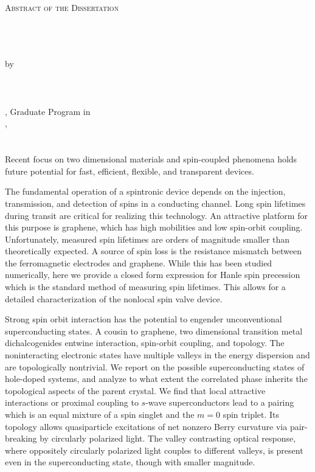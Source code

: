 \clearpage
\centering
\vspace*{-\toptafiddle}

\textsc{Abstract of the Dissertation} \\~\\

\SingleSpacing{}

\thetitle{} \\~\\
by \\~\\
\theauthor{} \\~\\

\thedegree, Graduate Program in \thefield{} \\
\theuniversity{}, \thedate{} \\
\thechair{} \\~\\

\justify{}
\DoubleSpacing{}
Recent focus on two dimensional materials and spin-coupled phenomena
holds future potential for fast, efficient, flexible, and transparent devices.

The fundamental operation of a spintronic device
depends on the injection, transmission, and detection
of spins in a conducting channel.
Long spin lifetimes during transit are critical for realizing this technology.
An attractive platform for this purpose is graphene, which has high mobilities
and low spin-orbit coupling.
Unfortunately, measured spin lifetimes are orders of magnitude smaller
than theoretically expected.
A source of spin loss is the resistance mismatch between
the ferromagnetic electrodes and graphene.
While this has been studied numerically,
here we provide a closed form expression for Hanle spin precession
which is the standard method of measuring spin lifetimes.
This allows for a detailed characterization of the nonlocal spin valve device.

Strong spin orbit interaction has the potential
to engender unconventional superconducting states.
A cousin to graphene, two dimensional transition metal dichalcogenides
entwine interaction, spin-orbit coupling, and topology.
The noninteracting electronic states have
multiple valleys in the energy dispersion
and are topologically nontrivial.
We report on the possible superconducting states
of hole-doped systems, and analyze to what extent the correlated phase
inherits the topological aspects of the parent crystal.
We find that local attractive interactions or proximal coupling to
$s$-wave superconductors lead to a pairing
which is an equal mixture of a spin singlet and the $m = 0$ spin triplet.
Its topology allows quasiparticle excitations
of net nonzero Berry curvature via pair-breaking by circularly polarized light.
The valley contrasting optical response,
where oppositely circularly polarized light couples to different valleys,
is present even in the superconducting state, though with smaller magnitude.

\enlargethispage{\bottafiddle}
\clearpage
